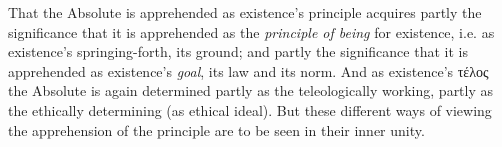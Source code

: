 \documentclass[12pt,a4paper]{book}
\begin{document}
That the Absolute is apprehended as existence's principle acquires partly the
significance that it is apprehended as the \emph{principle of being} for
existence, i.e. as existence's springing-forth, its ground; and partly the
significance that it is apprehended as existence's \emph{goal}, its law and
its norm. And as existence's τέλος the Absolute is again determined partly as
the teleologically working, partly as the ethically determining (as ethical
ideal). But these different ways of viewing the apprehension of the principle
are to be seen in their inner unity.
\end{document}
